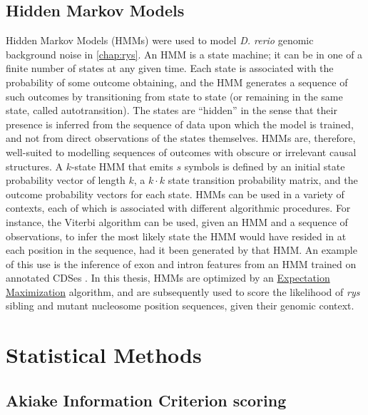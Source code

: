 \subsection{Hidden Markov Models}
\label{ssec:HMM}
Hidden Markov Models (HMMs) were used to model \textit{D. rerio} genomic background noise in \autoref{chap:rys}. An HMM is a state machine; it can be in one of a finite number of states at any given time. Each state is associated with the probability of some outcome obtaining, and the HMM generates a sequence of such outcomes by transitioning from state to state (or remaining in the same state, called autotransition). The states are ``hidden'' in the sense that their presence is inferred from the sequence of data upon which the model is trained, and not from direct observations of the states themselves. HMMs are, therefore, well-suited to modelling sequences of outcomes with obscure or irrelevant causal structures. A $k$-state HMM that emits $s$ symbols is defined by an initial state probability vector of length $k$, a $k\cdot k$ state transition probability matrix, and the outcome probability vectors for each state. HMMs can be used in a variety of contexts, each of which is associated with different algorithmic procedures. For instance, the Viterbi algorithm can be used, given an HMM and a sequence of observations, to infer the most likely state the HMM would have resided in at each position in the sequence, had it been generated by that HMM. An example of this use is the inference of exon and intron features from an HMM trained on annotated CDSes \cite{Henderson1997}. In this thesis, HMMs are optimized by an \hyperref[ssec:EM]{Expectation Maximization} algorithm, and are subsequently used to score the likelihood of \textit{rys} sibling and mutant nucleosome position sequences, given their genomic context.

\section{Statistical Methods}

\subsection{Akiake Information Criterion scoring}
\label{ssec:AIC}





